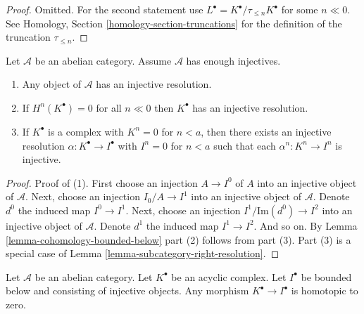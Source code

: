 \begin{proof}
Omitted. For the second statement use
$L^\bullet = K^\bullet / \tau_{\leq n}K^\bullet$ for
some $n \ll 0$. See
Homology, Section \ref{homology-section-truncations}
for the definition of the truncation $\tau_{\leq n}$.
\end{proof}

\begin{lemma}
\label{lemma-injective-resolutions-exist}
Let $\mathcal{A}$ be an abelian category.
Assume $\mathcal{A}$ has enough injectives.
\begin{enumerate}
\item Any object of $\mathcal{A}$ has an injective resolution.
\item If $H^n(K^\bullet) = 0$ for all $n \ll 0$ then
$K^\bullet$ has an injective resolution.
\item If $K^\bullet$ is a complex with $K^n = 0$ for $n < a$, then
there exists an injective resolution $\alpha : K^\bullet \to I^\bullet$
with $I^n = 0$ for $n < a$ such that each $\alpha^n : K^n \to I^n$ is
injective.
\end{enumerate}
\end{lemma}

\begin{proof}
Proof of (1). First choose an injection $A \to I^0$ of $A$ into an
injective object of $\mathcal{A}$. Next, choose an injection
$I_0/A \to I^1$ into an injective object of $\mathcal{A}$.
Denote $d^0$ the induced map $I^0 \to I^1$.
Next, choose an injection $I^1/\text{Im}(d^0) \to I^2$ into
an injective object of $\mathcal{A}$. Denote $d^1$ the induced
map $I^1 \to I^2$. And so on.
By Lemma \ref{lemma-cohomology-bounded-below} part (2) follows from part (3).
Part (3) is a special case of
Lemma \ref{lemma-subcategory-right-resolution}.
\end{proof}

\begin{lemma}
\label{lemma-acyclic-is-zero}
Let $\mathcal{A}$ be an abelian category.
Let $K^\bullet$ be an acyclic complex.
Let $I^\bullet$ be bounded below and consisting of injective objects.
Any morphism $K^\bullet \to I^\bullet$ is homotopic to zero.
\end{lemma}


